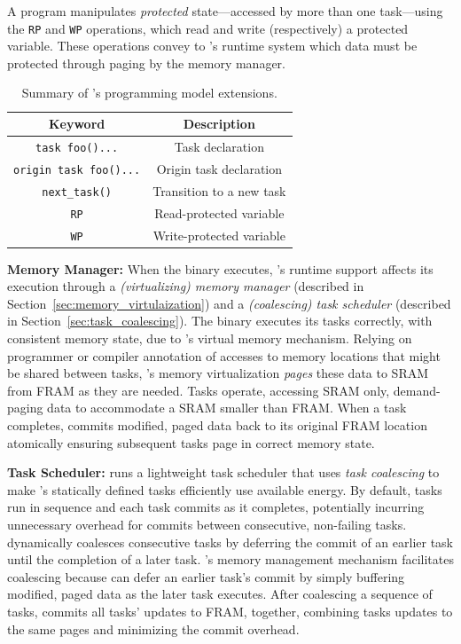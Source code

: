 A \sys program manipulates {\em protected} state---accessed by more than one task---using the {\tt RP} and {\tt WP} operations, which read and write (respectively) a protected variable. These operations convey to \sys's runtime system which data must be protected through paging by the memory manager.   

\begin{table}
	\centering
	\footnotesize
	\begin{tabular}{|c|c|}
		\hline
		Keyword & Description\\
		\hline\hline
		\texttt{task foo(){...}} & Task declaration\\
		\texttt{origin task foo(){...}} & Origin task declaration\\
		\texttt{next\_task()} & Transition to a new task\\
		\texttt{RP} & Read-protected variable\\
		\texttt{WP} & Write-protected variable\\
		\hline
	\end{tabular}
	\caption{Summary of \sys's programming model extensions.}
	\label{tab:viper_syntax}
\end{table}

\noindent \textbf{\sys Memory Manager:} When the binary executes, \sys's runtime support affects its execution through a {\em (virtualizing) memory manager} (described in Section~\ref{sec:memory_virtulaization}) and a {\em (coalescing) task scheduler} (described in Section~\ref{sec:task_coalescing}). The \sys binary executes its tasks correctly, with consistent memory state, due to \sys's virtual memory mechanism. Relying on programmer or compiler annotation of accesses to memory locations that might be shared between tasks, \sys's memory virtualization {\em pages} these data to SRAM from FRAM as they are needed. Tasks operate, accessing SRAM only, demand-paging data to accommodate a SRAM smaller than FRAM. When a task completes, \sys commits modified, paged data back to its original FRAM location atomically ensuring subsequent tasks page in correct memory state. 

\noindent \textbf{\sys Task Scheduler:} \sys runs a lightweight task scheduler that uses {\em task coalescing} to make \sys's statically defined tasks efficiently use available energy. By default, tasks run in sequence and each task commits as it completes, potentially incurring unnecessary overhead for commits between consecutive, non-failing tasks. \sys dynamically coalesces consecutive tasks by deferring the commit of an earlier task until the completion of a later task. \sys's memory management mechanism facilitates coalescing because \sys can defer an earlier task's commit by simply buffering modified, paged data as the later task executes. After coalescing a sequence of tasks, \sys commits all tasks' updates to FRAM, together, combining tasks updates to the same pages and minimizing the commit overhead.